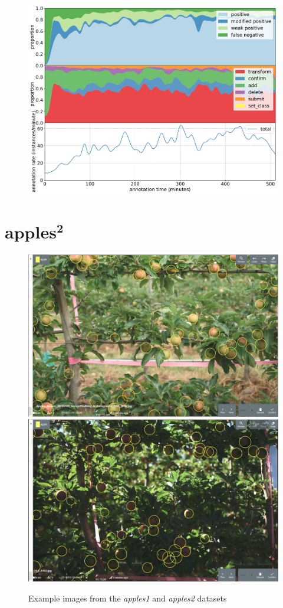 \begin{figure}[!h]
\centering
\includegraphics[width=1.0\linewidth]{charts/action_annotations/apples1.pdf}
\caption{  }
\label{fig:apples1_annotation}
\end{figure}

\pagebreak
\section{$\mathbf{apples^2}$}


\begin{figure}[!h]
  \includegraphics[width=0.475\linewidth]{figures/annotation/screenshots/apples2.png}
  \hfill
  \includegraphics[width=0.475\linewidth]{figures/annotation/screenshots/apples2_dark.png}
\caption{Example images from the \emph{apples1} and \emph{apples2} datasets}
\label{fig:apples2_dataset}  
\end{figure}

